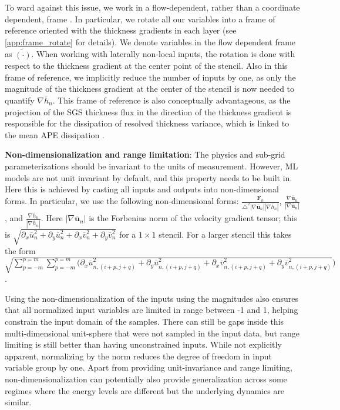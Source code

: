 \documentclass[draft]{agujournal2019}
\begin{document}
To ward against this issue, we work in a flow-dependent, rather than a coordinate dependent, frame \cite{prakash2022invariant}. In particular, we rotate all our variables into a frame of reference oriented with the thickness gradients in each layer (see \ref{app:frame_rotate} for details). We denote variables in the flow dependent frame as $\widetilde{(\cdot)}$.
When working with laterally non-local inputs, the rotation is done with respect to the thickness gradient at the center point of the stencil. 
Also in this frame of reference, we implicitly reduce the number of inputs by one, as only the magnitude of the thickness gradient at the center of the stencil is now needed to quantify $\nabla \overline{h}_n$. 
This frame of reference is also conceptually advantageous, as the projection of the SGS thickness flux in the direction of the thickness gradient is responsible for the dissipation of resolved thickness variance, which is linked to the mean APE dissipation \cite{loose2023diagnosing}. 


\textbf{Non-dimensionalization and range limitation}:
The physics and sub-grid parameterizations should be invariant to the units of measurement. However, ML models are not unit invariant by default, and this property needs to be built in. Here this is achieved by casting all inputs and outputs into non-dimensional forms. In particular, we use the following non-dimensional forms: $\frac{\mathbf{F}_n}{\triangle^2 |\nabla \overline{\mathbf{u}}_n| |\nabla \overline{h}_n|}$, $\frac{\nabla \overline{\mathbf{u}}_n}{|\nabla \overline{\mathbf{u}}_n|}$, and $\frac{\nabla \overline{h}_n}{|\nabla \overline{h}_n|}$. 
Here $|\nabla \overline{\mathbf{u}}_n|$ is the Forbenius norm of the velocity gradient tensor; this is $\sqrt{\partial_x \overline{u}_n^2 + \partial_y \overline{u}_n^2 + \partial_x \overline{v}_n^2 + \partial_y \overline{v}_n^2}$ for a $1\times1$ stencil. For a larger stencil this takes the form \\
$\sqrt{\sum_{p=-m}^{p=m} \sum_{p=-m}^{p=m} (\partial_x \overline{u}_{n, (i+p,j+q)}^{2} + \partial_y \overline{u}_{n, (i+p,j+q)}^2 + \partial_x \overline{v}_{n, (i+p,j+q)}^2 + \partial_y \overline{v}_{n, (i+p,j+q)}^2})$. 

Using the non-dimensionalization of the inputs using the magnitudes also ensures that all normalized input variables are limited in range between -1 and 1, helping constrain the input domain of the samples. There can still be gaps inside this multi-dimensional unit-sphere that were not sampled in the input data, but range limiting is still better than having unconstrained inputs. 
While not explicitly apparent, normalizing by the norm reduces the degree of freedom in input variable group by one. 
Apart from providing unit-invariance and range limiting, non-dimensionalization can potentially also provide generalization across some regimes where the energy levels are different but the underlying dynamics are similar.
\end{document}
